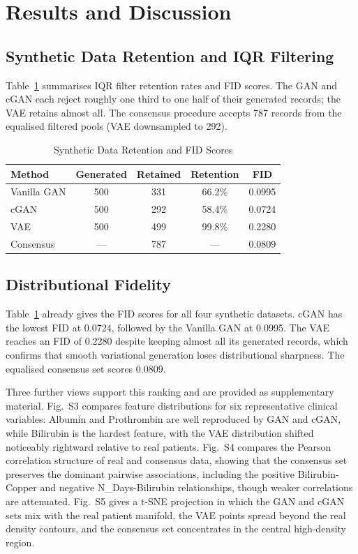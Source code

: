 \documentclass[journal]{IEEEtran}
\begin{document}
\section{Results and Discussion}
\label{sec:results}

\subsection{Synthetic Data Retention and IQR Filtering}

Table~\ref{tab:retention} summarises IQR filter retention rates and FID scores. The GAN and cGAN each reject roughly one third to one half of their generated records; the VAE retains almost all. The consensus procedure accepts 787 records from the equalised filtered pools (VAE downsampled to 292).

\begin{table}[!tb]
  \centering
  \caption{Synthetic Data Retention and FID Scores}
  \label{tab:retention}
  \begin{tabular}{lcccc}
    \toprule
    Method & Generated & Retained & Retention & FID \\
    \midrule
    Vanilla GAN   & 500 & 331 & 66.2\% & 0.0995 \\
    cGAN         & 500 & 292 & 58.4\% & 0.0724 \\
    VAE          & 500 & 499 & 99.8\% & 0.2280 \\
    Consensus     & ---  & 787 & ---   & 0.0809 \\
    \bottomrule
  \end{tabular}
\end{table}

\subsection{Distributional Fidelity}

Table~\ref{tab:retention} already gives the FID scores for all four synthetic datasets. cGAN has the lowest FID at 0.0724, followed by the Vanilla GAN at 0.0995. The VAE reaches an FID of 0.2280 despite keeping almost all its generated records, which confirms that smooth variational generation loses distributional sharpness. The equalised consensus set scores 0.0809.

Three further views support this ranking and are provided as supplementary material. Fig.~S3 compares feature distributions for six representative clinical variables: Albumin and Prothrombin are well reproduced by GAN and cGAN, while Bilirubin is the hardest feature, with the VAE distribution shifted noticeably rightward relative to real patients. Fig.~S4 compares the Pearson correlation structure of real and consensus data, showing that the consensus set preserves the dominant pairwise associations, including the positive Bilirubin-Copper and negative N\_Days-Bilirubin relationships, though weaker correlations are attenuated. Fig.~S5 gives a t-SNE projection in which the GAN and cGAN sets mix with the real patient manifold, the VAE points spread beyond the real density contours, and the consensus set concentrates in the central high-density region.
\end{document}

